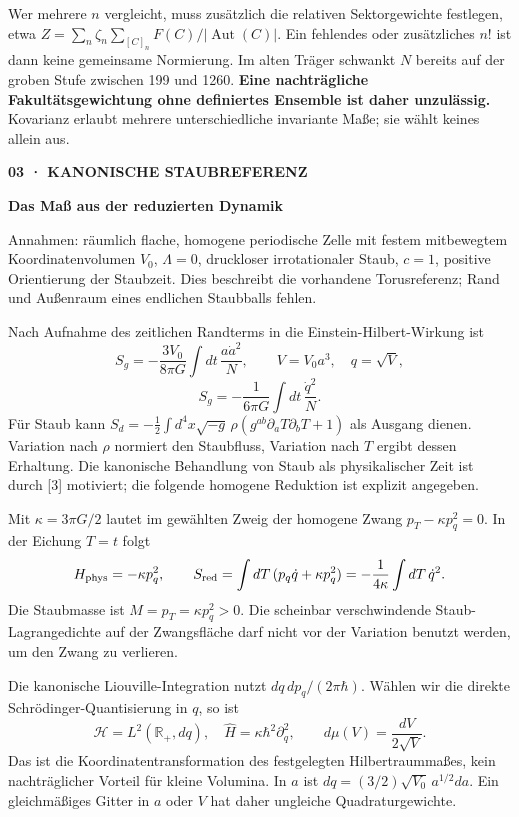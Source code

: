 \documentclass[11pt,a4paper]{article}
\newcommand{\kicker}[1]{{\sffamily\small\bfseries\color{teal}#1}\par}
\newcommand{\tit}[1]{{\sffamily\LARGE\bfseries\color{ink}#1}\par\vspace{6pt}}
\newcommand{\sect}[1]{\par\vspace{6pt}{\sffamily\large\bfseries\color{ink}#1}\par}
\newcommand{\Aut}{\operatorname{Aut}}
\begin{document}
Wer mehrere $n$ vergleicht, muss zusätzlich die relativen Sektorgewichte festlegen, etwa $Z=\sum_n\zeta_n\sum_{[C]_n}F(C)/|\Aut(C)|$. Ein fehlendes oder zusätzliches $n!$ ist dann keine gemeinsame Normierung. Im alten Träger schwankt $N$ bereits auf der groben Stufe zwischen 199 und 1260. \textbf{Eine nachträgliche Fakultätsgewichtung ohne definiertes Ensemble ist daher unzulässig.} Kovarianz erlaubt mehrere unterschiedliche invariante Maße; sie wählt keines allein aus.

\newpage
\kicker{03 · KANONISCHE STAUBREFERENZ}
\tit{Das Maß aus der reduzierten Dynamik}
Annahmen: räumlich flache, homogene periodische Zelle mit festem mitbewegtem Koordinatenvolumen $V_0$, $\Lambda=0$, druckloser irrotationaler Staub, $c=1$, positive Orientierung der Staubzeit. Dies beschreibt die vorhandene Torusreferenz; Rand und Außenraum eines endlichen Staubballs fehlen.

Nach Aufnahme des zeitlichen Randterms in die Einstein-Hilbert-Wirkung ist
\[
 S_g=-\frac{3V_0}{8\pi G}\int dt\,\frac{a\dot a^2}{N},\qquad
 V=V_0a^3,\quad q=\sqrt V,
\]
\[
 S_g=-\frac1{6\pi G}\int dt\,\frac{\dot q^2}{N}.
\]
Für Staub kann $S_d=-\frac12\int d^4x\sqrt{-g}\,\rho(g^{ab}\partial_aT\partial_bT+1)$ als Ausgang dienen. Variation nach $\rho$ normiert den Staubfluss, Variation nach $T$ ergibt dessen Erhaltung. Die kanonische Behandlung von Staub als physikalischer Zeit ist durch [3] motiviert; die folgende homogene Reduktion ist explizit angegeben.

\sect{Zwang zuerst, Zeitwahl danach}
Mit $\kappa=3\pi G/2$ lautet im gewählten Zweig der homogene Zwang $p_T-\kappa p_q^2=0$. In der Eichung $T=t$ folgt
\[
 H_{\rm phys}=-\kappa p_q^2,\qquad
 S_{\rm red}=\int dT\,(p_q\dot q+\kappa p_q^2)
             =-\frac1{4\kappa}\int dT\,\dot q^2.
\]
Die Staubmasse ist $M=p_T=\kappa p_q^2>0$. Die scheinbar verschwindende Staub-Lagrangedichte auf der Zwangsfläche darf nicht vor der Variation benutzt werden, um den Zwang zu verlieren.

Die kanonische Liouville-Integration nutzt $dq\,dp_q/(2\pi\hbar)$. Wählen wir die direkte Schrödinger-Quantisierung in $q$, so ist
\[
 \mathcal H=L^2(\mathbb R_+,dq),\quad
 \widehat H=\kappa\hbar^2\partial_q^2,\qquad
 \boxed{d\mu(V)=\frac{dV}{2\sqrt V}}.
\]
Das ist die Koordinatentransformation des festgelegten Hilbertraummaßes, kein nachträglicher Vorteil für kleine Volumina. In $a$ ist $dq=(3/2)\sqrt{V_0}\,a^{1/2}da$. Ein gleichmäßiges Gitter in $a$ oder $V$ hat daher ungleiche Quadraturgewichte.
\end{document}
